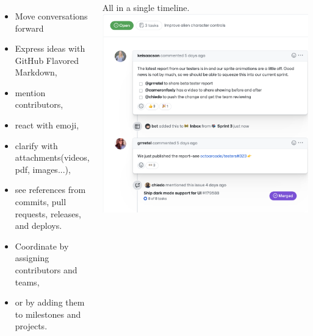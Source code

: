 \begin{frame}
  \frametitle{\insertsectionhead}
  \framesubtitle{\insertsubsectionhead}
  \begin{columns}
    \scriptsize
    \begin{itemize}
      \item Move conversations forward
      \item Express ideas with GitHub Flavored Markdown, 
      \item mention contributors, 
      \item react with emoji, 
      \item clarify with attachments(videos, pdf, images...), 
      \item see references from commits, pull requests, releases, and deploys. 
      \item Coordinate by assigning contributors and teams, 
      \item or by adding them to milestones and projects. 
    \end{itemize}
    \centering\vspace{1cm}
    \alert{All in a single timeline.}
    \includegraphics[width=.9\linewidth]{../../figures/conversations-1.png}
  \end{columns}

\end{frame}


